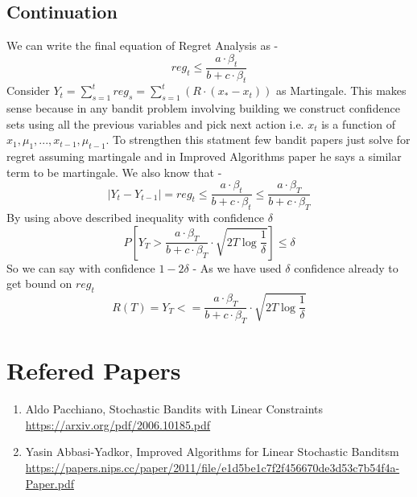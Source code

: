 \documentclass[a4paper]{article}
\begin{document}
\subsection{Continuation}
We can write the final equation of Regret Analysis as -
$$ reg_t \leq \frac{a \cdot \beta_t}{b + c\cdot\beta_t } $$
Consider $ Y_t = \sum_{s = 1}^t reg_s =  \sum_{s = 1}^t (R\cdot (x_* - x_t)) $ as Martingale. This makes sense because in any bandit problem involving building we construct confidence sets using all the previous variables and pick next action i.e. $ x_t $ is a function of $ x_1, \mu_1, ... , x_{t-1}, \mu_{t-1} $. To strengthen this statment few bandit papers just solve for regret assuming martingale and in Improved Algorithms paper he says a similar term to be martingale. We also know that - 
$$ |Y_t - Y_{t-1}| = reg_t \leq \frac{a \cdot \beta_t}{b + c\cdot\beta_t } \leq \frac{a \cdot \beta_T}{b + c\cdot\beta_T } $$
By using above described inequality with confidence $\delta$
$$ P{\left[Y_T > \frac{a \cdot \beta_T}{b + c\cdot\beta_T} \cdot \sqrt{2T\log{\frac{1}{\delta}}}\right]} \leq \delta $$
So we can say with confidence $1-2\delta$ - As we have used $\delta$ confidence already to get bound on $reg_t$
$$ R(T) = Y_T <= \frac{a \cdot \beta_T}{b + c\cdot\beta_T} \cdot \sqrt{2T\log{\frac{1}{\delta}}} $$






\section{Refered Papers}
\begin{enumerate}
    \item Aldo Pacchiano, Stochastic Bandits with Linear Constraints \\ \url{https://arxiv.org/pdf/2006.10185.pdf}
    \item Yasin Abbasi-Yadkor, Improved Algorithms for Linear Stochastic Banditsm \\ \url{https://papers.nips.cc/paper/2011/file/e1d5be1c7f2f456670de3d53c7b54f4a-Paper.pdf}
\end{enumerate}







\end{document}
